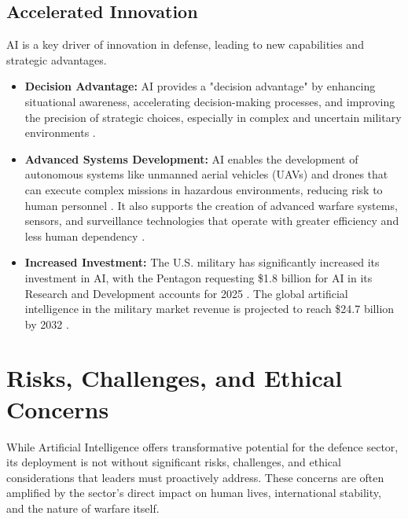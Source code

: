 \subsection{Accelerated Innovation}
AI is a key driver of innovation in defense, leading to new capabilities and strategic advantages.
\begin{itemize}
    \item \textbf{Decision Advantage:} AI provides a "decision advantage" by enhancing situational awareness, accelerating decision-making processes, and improving the precision of strategic choices, especially in complex and uncertain military environments \cite{AIDefenceJournal_Benefits, TechStrong_Benefits}.
    \item \textbf{Advanced Systems Development:} AI enables the development of autonomous systems like unmanned aerial vehicles (UAVs) and drones that can execute complex missions in hazardous environments, reducing risk to human personnel \cite{AdaptForward_Benefits}. It also supports the creation of advanced warfare systems, sensors, and surveillance technologies that operate with greater efficiency and less human dependency \cite{SDI_Benefits}.
    \item \textbf{Increased Investment:} The U.S. military has significantly increased its investment in AI, with the Pentagon requesting \$1.8 billion for AI in its Research and Development accounts for 2025 \cite{BCG_Benefits}. The global artificial intelligence in the military market revenue is projected to reach \$24.7 billion by 2032 \cite{MarketUS_Benefits}.
\end{itemize}

\section{Risks, Challenges, and Ethical Concerns}

While Artificial Intelligence offers transformative potential for the defence sector, its deployment is not without significant risks, challenges, and ethical considerations that leaders must proactively address. These concerns are often amplified by the sector's direct impact on human lives, international stability, and the nature of warfare itself.

